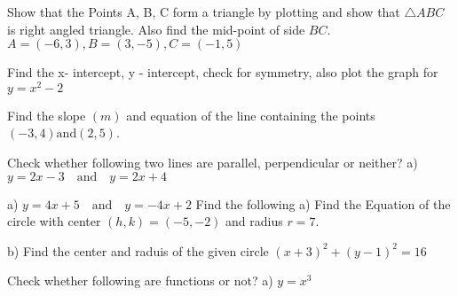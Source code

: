 \documentclass{exam}
\begin{document}
 
\begin{center}
\end{center}
 
\vspace{5mm}
 
 
\vspace{5mm}
 
 
\begin{questions}
	
	\question Show that the Points A, B, C form a triangle by plotting and show that \(\triangle ABC \) is right angled triangle. Also find the mid-point of side \(BC\). \(A=(-6,3), B=(3, -5), C=(-1,5)\)
	\hfill\enspace\hrulefill
	
	\clearpage
	\question Find the x- intercept, y - intercept, check for symmetry, also plot the graph for   $y = x^2-2$
	\hfill\enspace\hrulefill
	\clearpage
	
	\question Find the slope \((m)\) and equation of the line containing the points \((-3,4) \mbox{and} (2,5) \).
	\hfill\enspace\hrulefill 
	
	\question Check whether following two lines are parallel, perpendicular or neither? 
	\subitem a) \(y=2x-3 \quad \mbox{and} \quad y=2x+4\) \hfill\enspace\hrulefill 
	
	\subitem a) \(y=4x+5 \quad \mbox{and} \quad y=-4x+2\) \hfill\enspace\hrulefill 
	\clearpage
	\question Find the following
	\subitem a) Find the Equation of the circle with center  \((h,k)=(-5,-2)\) and radius \(r=7\).
	\hfill\enspace\hrulefill 
	
	\subitem b) Find the center and raduis of the given circle  \((x+3)^2+(y-1)^2=16\) 
	\hfill\enspace\hrulefill 
	
	\question Check whether following are functions or not?  
	\subitem a) \(y=x^3\)   \hfill \hfill\enspace\hrulefill 
	

\end{questions}
\end{document}
